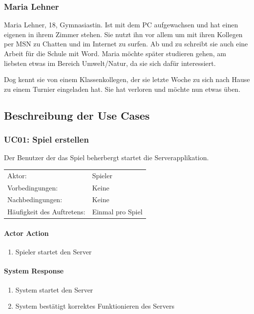 \documentclass[a4paper,12pt,halfparskip,DIV14]{scrartcl}
\begin{document}
\subsubsection{Maria Lehner}\label{sub:maria_lehner} 

Maria Lehner, 18, Gymnasiastin. Ist mit dem PC aufgewachsen und hat einen eigenen in ihrem Zimmer stehen. Sie nutzt ihn vor allem um mit ihren Kollegen per MSN zu Chatten und im Internet zu surfen. Ab und zu schreibt sie auch eine Arbeit für die Schule mit Word. Maria möchte später studieren gehen, am liebsten etwas im Bereich Umwelt/Natur, da sie sich dafür interessiert. 

Dog kennt sie von einem Klassenkollegen, der sie letzte Woche zu sich nach Hause zu einem Turnier eingeladen hat. Sie hat verloren und möchte nun etwas üben.

\subsection{Beschreibung der Use Cases}\label{sub:use_cases}
\subsubsection{UC01: Spiel erstellen}\label{ssub:uc01_spiel_erstellen}
Der Benutzer der das Spiel beherbergt startet die Serverapplikation.

\begin{tabular}{@{} l l @{}}
	Aktor:       								&	Spieler \\
	Vorbedingungen:							& Keine \\
	Nachbedingungen:						& Keine \\
	Häufigkeit des Auftretens:	& Einmal pro Spiel \\
\end{tabular}

\vspace{0.5cm}

\begin{multicols}{2}
\raggedcolumns
\paragraph{Actor Action}
\begin{enumerate}
	\item[1] Spieler startet den Server
\end{enumerate}
\columnbreak
\paragraph{System Response}
\begin{enumerate}
	\item[2] System startet den Server
	\item[3] System bestätigt korrektes Funktionieren des Servers
\end{enumerate}
\end{multicols}
\end{document}
